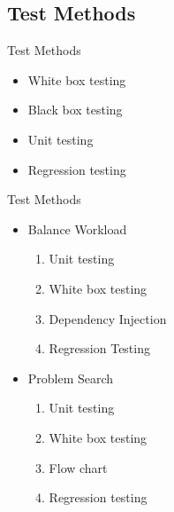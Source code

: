\subsection{Test Methods}
\begin{frame}{Test Methods}
	\begin{itemize}
		\item White box testing
		\item Black box testing
		\item Unit testing
		\item Regression testing
	\end{itemize}
\end{frame}

\begin{frame}{Test Methods}
	\begin{itemize}
		\item Balance Workload
			\begin{enumerate}
				\item Unit testing
				\item White box testing
				\item Dependency Injection
				\item Regression Testing
			\end{enumerate}
		\item Problem Search
		\begin{enumerate}
				\item Unit testing
				\item White box testing
			\item Flow chart
			\item Regression testing
		\end{enumerate}
	\end{itemize}
\end{frame}